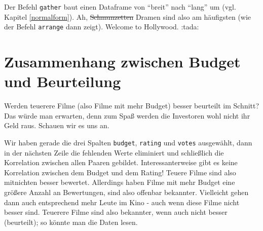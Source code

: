 \documentclass[12pt,ngerman,]{book}
\makeatletter
\newenvironment{Shaded}{\begin{snugshade}}{\end{snugshade}}
\newcommand{\KeywordTok}[1]{\textcolor[rgb]{0.13,0.29,0.53}{\textbf{{#1}}}}
\newcommand{\StringTok}[1]{\textcolor[rgb]{0.31,0.60,0.02}{{#1}}}
\newcommand{\CommentTok}[1]{\textcolor[rgb]{0.56,0.35,0.01}{\textit{{#1}}}}
\newcommand{\NormalTok}[1]{{#1}}
\newenvironment{kframe}{%
\medskip{}
\setlength{\fboxsep}{.8em}
 \def\at@end@of@kframe{}%
 \ifinner\ifhmode%
  \def\at@end@of@kframe{\end{minipage}}%
  \begin{minipage}{\columnwidth}%
 \fi\fi%
 \def\FrameCommand##1{\hskip\@totalleftmargin \hskip-\fboxsep
 \colorbox{shadecolor}{##1}\hskip-\fboxsep
     \hskip-\linewidth \hskip-\@totalleftmargin \hskip\columnwidth}%
 \MakeFramed {\advance\hsize-\width
   \@totalleftmargin\z@ \linewidth\hsize
   \@setminipage}}%
 {\par\unskip\endMakeFramed%
 \at@end@of@kframe}
\renewenvironment{Shaded}{\begin{kframe}}{\end{kframe}}
\theoremstyle{definition}
\theoremstyle{definition}
\theoremstyle{remark}
\makeatother
\begin{document}
\begin{Shaded}
\end{Shaded}

Der Befehl \texttt{gather} baut einen Dataframe von ``breit'' nach
``lang'' um (vgl. Kapitel \ref{normalform}). Ah, \sout{Schmunzetten}
Dramen sind also am häufigsten (wie der Befehl \texttt{arrange} dann
zeigt). Welcome to Hollywood. :tada:

\section{Zusammenhang zwischen Budget und
Beurteilung}\label{zusammenhang-zwischen-budget-und-beurteilung}

Werden teuerere Filme (also Filme mit mehr Budget) besser beurteilt im
Schnitt? Das würde man erwarten, denn zum Spaß werden die Investoren
wohl nicht ihr Geld raus. Schauen wir es uns an.

\begin{Shaded}
\end{Shaded}

Wir haben gerade die drei Spalten \texttt{budget}, \texttt{rating} und
\texttt{votes} ausgewählt, dann in der nächsten Zeile die fehlenden
Werte eliminiert und schließlich die Korrelation zwischen allen Paaren
gebildet. Interessanterweise gibt es keine Korrelation zwischen dem
Budget und dem Rating! Teuere Filme sind also mitnichten besser
bewertet. Allerdings haben Filme mit mehr Budget eine größere Anzahl an
Bewertungen, sind also offenbar bekannter. Vielleicht gehen dann auch
entsprechend mehr Leute im Kino - auch wenn diese Filme nicht besser
sind. Teuerere Filme sind also bekannter, wenn auch nicht besser
(beurteilt); so könnte man die Daten lesen.
\end{document}
